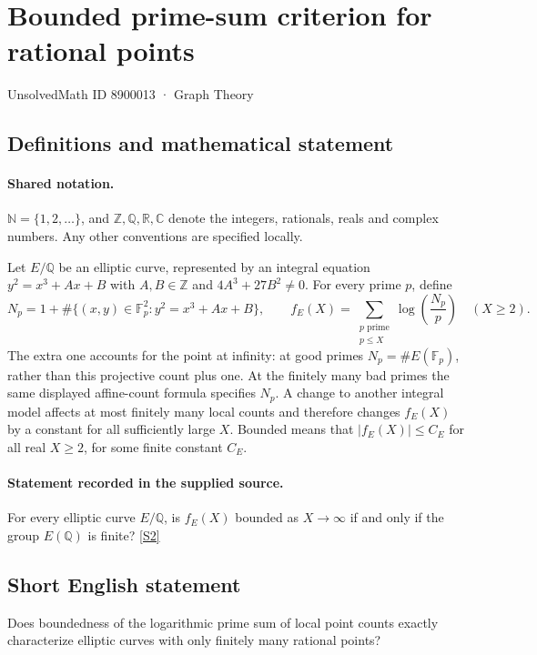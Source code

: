 \documentclass[11pt]{article}
\newcommand{\sref}[2]{\hyperlink{source:#1:#2}{[S#2]}}
\begin{document}
\setcounter{section}{8900012}
\section{Bounded prime-sum criterion for rational points}\label{8900013}
{\small\sffamily UnsolvedMath ID 8900013 · Graph Theory}
\subsection{Definitions and mathematical statement}

\paragraph{Shared notation.}$\mathbb N=\{1,2,\ldots\}$, and $\mathbb Z,\mathbb Q,\mathbb R,\mathbb C$ denote the integers, rationals, reals and complex numbers. Any other conventions are specified locally.


Let $E/\mathbb Q$ be an elliptic curve, represented by an integral equation $y^2=x^3+Ax+B$ with $A,B\in\mathbb Z$ and $4A^3+27B^2\ne0$. For every prime $p$, define
\[
N_p=1+\#\{(x,y)\in\mathbb F_p^2:y^2=x^3+Ax+B\},\qquad
f_E(X)=\sum_{\substack{p\text{ prime}\\p\le X}}\log\!\left(\frac{N_p}{p}\right)\quad(X\ge2).
\]
The extra one accounts for the point at infinity: at good primes $N_p=\#E(\mathbb F_p)$, rather than this projective count plus one. At the finitely many bad primes the same displayed affine-count formula specifies $N_p$. A change to another integral model affects at most finitely many local counts and therefore changes $f_E(X)$ by a constant for all sufficiently large $X$. Bounded means that $|f_E(X)|\le C_E$ for all real $X\ge2$, for some finite constant $C_E$.
\paragraph{Statement recorded in the supplied source.}
For every elliptic curve $E/\mathbb Q$, is $f_E(X)$ bounded as $X\to\infty$ if and only if the group $E(\mathbb Q)$ is finite? \sref{8900013}{2}
\subsection{Short English statement}
Does boundedness of the logarithmic prime sum of local point counts exactly characterize elliptic curves with only finitely many rational points?
\end{document}
